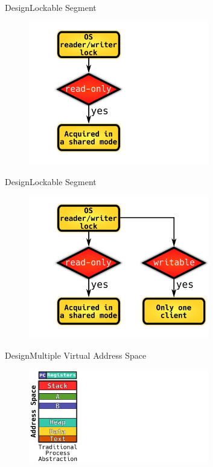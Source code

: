 \documentclass[10pt]{beamer}
\begin{document}
\begin{frame}{Design}{Lockable Segment}
  \begin{figure}[ht]
    \centering
    \includegraphics[width=0.7\textwidth, keepaspectratio=true]{images/lockable_segment_b.png}
  \end{figure}
\end{frame}

\begin{frame}{Design}{Lockable Segment}
  \begin{figure}[ht]
    \centering
    \includegraphics[width=0.7\textwidth, keepaspectratio=true]{images/lockable_segment_c.png}
  \end{figure}
\end{frame}

\begin{frame}{Design}{Multiple Virtual Address Space}
  \begin{figure}[ht]
    \centering
    \includegraphics[width=0.7\textwidth, keepaspectratio=true]{images/traditional_vs_new_a.png}
  \end{figure}
\end{frame}
\end{document}
